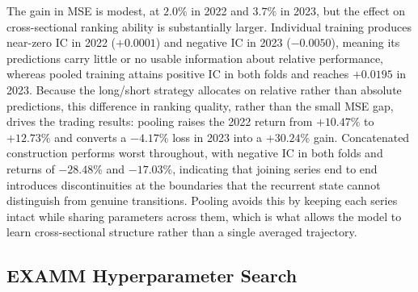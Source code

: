 The gain in MSE is modest, at $2.0\%$ in 2022 and $3.7\%$ in 2023, but the effect on cross-sectional ranking ability is substantially larger. Individual training produces near-zero IC in 2022 ($+0.0001$) and negative IC in 2023 ($-0.0050$), meaning its predictions carry little or no usable information about relative performance, whereas pooled training attains positive IC in both folds and reaches $+0.0195$ in 2023. Because the long/short strategy allocates on relative rather than absolute predictions, this difference in ranking quality, rather than the small MSE gap, drives the trading results: pooling raises the 2022 return from $+10.47\%$ to $+12.73\%$ and converts a $-4.17\%$ loss in 2023 into a $+30.24\%$ gain. Concatenated construction performs worst throughout, with negative IC in both folds and returns of $-28.48\%$ and $-17.03\%$, indicating that joining series end to end introduces discontinuities at the boundaries that the recurrent state cannot distinguish from genuine transitions. Pooling avoids this by keeping each series intact while sharing parameters across them, which is what allows the model to learn cross-sectional structure rather than a single averaged trajectory.


\begin{table}[t]
\centering
\caption{Pooling ablation on the Baseline Portfolio.}
\label{tab:pooling-ablation}
\end{table}

\subsection{EXAMM Hyperparameter Search}
\label{sec:examm-hparams}

